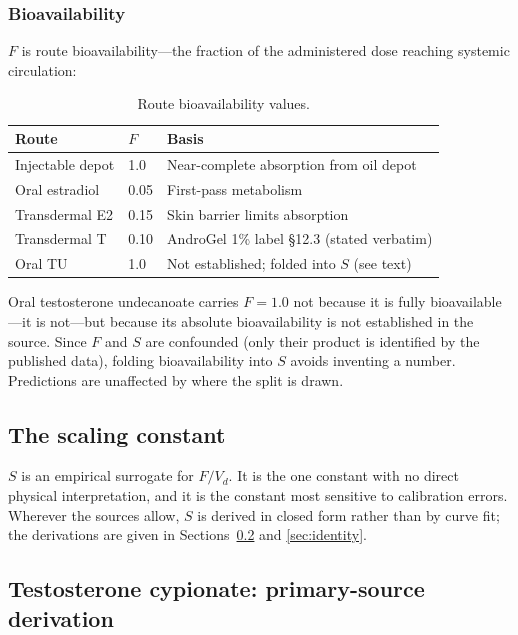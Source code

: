 \documentclass[11pt,a4paper]{article}
\begin{document}
\subsubsection{Bioavailability}

$F$ is route bioavailability---the fraction of the administered dose
reaching systemic circulation:

\begin{table}[h]
\centering
\small
\begin{tabular}{@{}lll@{}}
\toprule
\textbf{Route} & \textbf{$F$} & \textbf{Basis} \\
\midrule
Injectable depot & 1.0 & Near-complete absorption from oil depot \\
Oral estradiol   & 0.05 & First-pass metabolism \\
Transdermal E2   & 0.15 & Skin barrier limits absorption \\
Transdermal T    & 0.10 & AndroGel 1\% label \S12.3 (stated verbatim) \\
Oral TU          & 1.0  & Not established; folded into $S$ (see text) \\
\bottomrule
\end{tabular}
\caption{Route bioavailability values.}
\label{tab:bioavailability}
\end{table}

Oral testosterone undecanoate carries $F = 1.0$ not because it is fully
bioavailable---it is not---but because its absolute bioavailability is
not established in the source. Since $F$ and $S$ are confounded (only
their product is identified by the published data), folding
bioavailability into $S$ avoids inventing a number. Predictions are
unaffected by where the split is drawn.

\subsection{The scaling constant}
\label{sec:scaling}

$S$ is an empirical surrogate for $F/V_d$. It is the one constant with
no direct physical interpretation, and it is the constant most sensitive
to calibration errors. Wherever the sources allow, $S$ is derived in
closed form rather than by curve fit; the derivations are given in
Sections~\ref{sec:tc} and \ref{sec:identity}.

\subsection{Testosterone cypionate: primary-source derivation}
\label{sec:tc}
\end{document}
